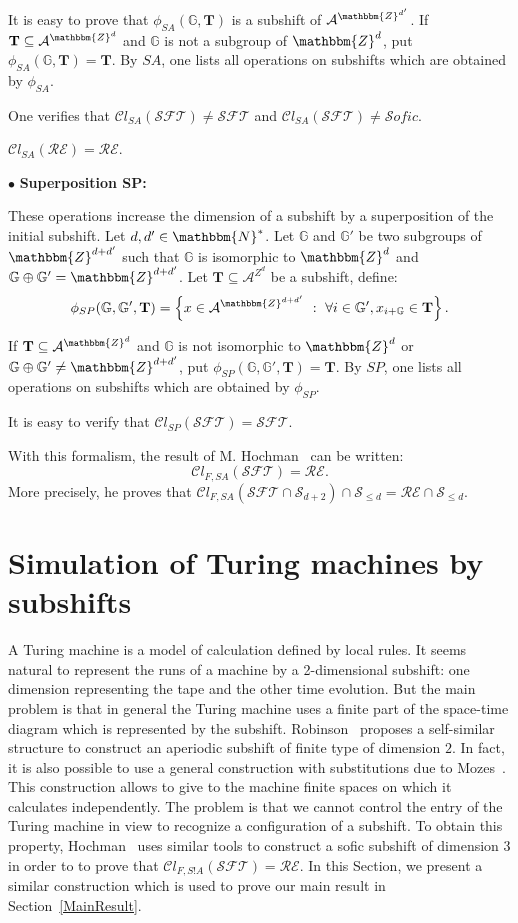\documentclass[proceedings]{stacs}
\theoremstyle{plain}\newtheorem{satz}[thm]{Satz}
\theoremstyle{definition}\newtheorem{crucial}[thm]{Crucial Definition}
\newcommand{\G}{\mathbb{G}}
\newcommand{\Z}{\mathbbm{Z}}
\newcommand{\N}{\mathbbm{N}}
\newcommand{\A}{\mathcal{A}}
\newcommand{\T}{\mathbf{T}}
\newcommand{\SFT}{\mathcal{SFT}}
\newcommand{\sofic}{\mathcal{S}ofic}
\newcommand{\shift}{\mathcal{S}}
\newcommand{\reshift}{\mathcal{RE}}
\begin{document}
It is easy to prove that $\phi_{SA}(\G,\T)$ is a subshift of $\A^{\Z^{d'}}$. If $\T\subseteq\A^{\Z^d}$ and $\G$ is not a subgroup of $\Z^d$, put $ \phi_{SA}(\G,\T)= \T$. By $SA$, one lists all operations on subshifts which are obtained by $\phi_{SA}$.

One verifies that $\mathcal{C}l_{SA}(\SFT)\ne\SFT$ and $\mathcal{C}l_{SA}(\SFT)\ne\sofic$.

\begin{theorem}\label{stabRE}
$\mathcal{C}l_{SA}(\reshift)=\reshift$.
\end{theorem}

\noindent $\bullet$ \textbf{Superposition SP:}

These operations increase the dimension of a subshift by a superposition of the initial subshift. Let $d,d'\in\N^{\ast}$. Let $\G$ and $\G'$ be two subgroups of $\Z^{d+d'}$ such that $\G$ is isomorphic to $\Z^d$ and $\G\oplus \G'=\Z^{d+d'}$. Let $\T\subseteq\A^{Z^d}$ be a subshift, define:
$$\phi_{SP}(\G,\G',\T)=\left\{x\in\A^{\Z^{d+d'}}\ :\  \forall i\in\G',x_{i+\G}\in\T \right\}.$$

If $\T\subseteq\A^{\Z^d}$ and $\G$ is not isomorphic to $\Z^d$ or $\G\oplus\G'\ne\Z^{d+d'}$, put $ \phi_{SP}(\G,\G',\T)= \T$. By $SP$, one lists all operations on subshifts which are obtained by $\phi_{SP}$.

It is easy to verify that $\mathcal{C}l_{SP}(\SFT)=\SFT$.

With this formalism, the result of M. Hochman~\cite{hochman2007drp} can be written:
$$\mathcal{C}l_{F,SA}(\SFT)=\reshift.$$
More precisely, he proves that $\mathcal{C}l_{F,SA}(\SFT\cap \shift_{d+2})\cap\shift_{\leq d}=\reshift\cap\shift_{\leq d}.$



\section{Simulation of Turing machines by subshifts}\label{TuringMachine}

A Turing machine is a model of calculation defined by local rules. It seems natural to represent the runs of a machine by a 2-dimensional subshift: one dimension representing the tape and the other time evolution. But the main problem is that in general the Turing machine uses a finite part of the space-time diagram which is represented by the subshift. Robinson~\cite{robinson1971uan} proposes a self-similar structure to construct an aperiodic subshift of finite type of dimension $2$. In fact, it is also possible to use a general construction with substitutions due to Mozes~\cite{mozes1989tss}. This construction allows to give to the machine finite spaces on which it calculates independently. The problem is that we cannot control the entry of the Turing machine in view to recognize a configuration of a subshift. To obtain this property, Hochman~\cite{hochman2007drp} uses similar tools to construct a sofic subshift of dimension $3$ in order to to prove that $\mathcal{C}l_{F,S!
 A}(\SFT)=\reshift$. In this Section, we present a similar construction which is used to prove our main result in Section~\ref{MainResult}.
\end{document}
